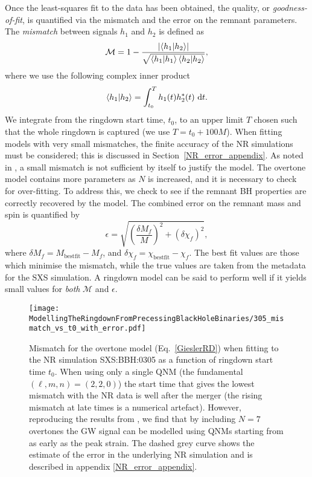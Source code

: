 Once the least-squares fit to the data has been obtained, the quality, or \emph{goodness-of-fit}, is quantified via the mismatch and the error on the remnant parameters.
The \emph{mismatch} between signals $h_1$ and $h_2$ is defined as
\begin{equation}\label{mismatch}
    \mathcal{M} = 1 - \frac{\abs{ \braket{h_1}{h_2} }}{\sqrt{\braket{h_1}\braket{h_2}}},
\end{equation}
where we use the following complex inner product \cite{Nollert:1998ys}
\begin{equation} \label{eq:inner_prod}
    \braket{h_1}{h_2} = \int_{t_0}^T h_1(t) h^*_2(t) ~ \dd t.
\end{equation}
We integrate from the ringdown start time, $t_0$, to an upper limit $T$ chosen such that the whole ringdown is captured (we use $T = t_0 + 100M$).
When fitting models with very small mismatches, the finite accuracy of the NR simulations must be considered; this is discussed in Section~\ref{NR_error_appendix}.
As noted in \cite{Giesler:2019uxc}, a small mismatch is not sufficient by itself to justify the model.
The overtone model contains more parameters as $N$ is increased, and it is necessary to check for over-fitting.
To address this, we check to see if the remnant BH properties are correctly recovered by the model. 
The combined error on the remnant mass and spin is quantified by \cite{Giesler:2019uxc}
\begin{equation} \label{eq:epsilon}
    \epsilon = \sqrt{ \left( \frac{\delta M_f}{M} \right)^2 + \left( \delta\chi_f \right)^2 },
\end{equation}
where $\delta M_f = M_{\mathrm{best fit}} - M_f$, and $\delta \chi_f = \chi_{\mathrm{best fit}} - \chi_f$. 
The best fit values are those which minimise the mismatch, while the true values are taken from the metadata for the SXS simulation.
A ringdown model can be said to perform well if it yields small values for \emph{both} $\mathcal{M}$ and $\epsilon$.

\begin{figure}[t]
    \centering
    \texttt{[image: ModellingTheRingdownFromPrecessingBlackHoleBinaries/305\_mismatch\_vs\_t0\_with\_error.pdf]}
    \caption[Mismatch as a function of ringdown start time for an overtone model fitted to SXS:BBH:0305]{ 
    Mismatch for the overtone model (Eq.~\ref{GieslerRD}) when fitting to the NR simulation SXS:BBH:0305 as a function of ringdown start time $t_0$. When using only a single QNM (the fundamental $(\ell,m,n)=(2,2,0)$) the start time that gives the lowest mismatch with the NR data is well after the merger (the rising mismatch at late times is a numerical artefact). However, reproducing the results from \cite{Giesler:2019uxc}, we find that by including $N=7$ overtones the GW signal can be modelled using QNMs starting from as early as the peak strain. The dashed grey curve shows the estimate of the error in the underlying NR simulation and is described in appendix \ref{NR_error_appendix}.}
	\label{305_mismatch_vs_t0}
\end{figure}

